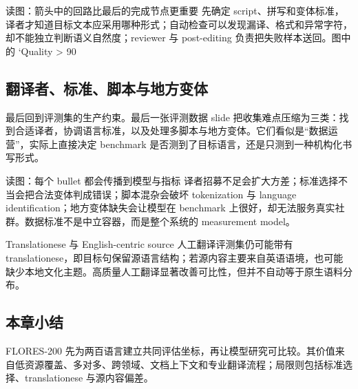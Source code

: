 \begin{knowledgebox}{读图：箭头中的回路比最后的完成节点更重要}
先确定 script、拼写和变体标准，译者才知道目标文本应采用哪种形式；自动检查可以发现漏译、格式和异常字符，却不能独立判断语义自然度；reviewer 与 post-editing 负责把失败样本送回。图中的 `Quality > 90%
\end{knowledgebox}


\subsection{翻译者、标准、脚本与地方变体}

最后回到评测集的生产约束。最后一张评测数据 slide 把收集难点压缩为三类：找到合适译者，协调语言标准，以及处理多脚本与地方变体。它们看似是“数据运营”，实际上直接决定 benchmark 是否测到了目标语言，还是只测到一种机构化书写形式。


\begin{knowledgebox}{读图：每个 bullet 都会传播到模型与指标}
译者招募不足会扩大方差；标准选择不当会把合法变体判成错误；脚本混杂会破坏 tokenization 与 language identification；地方变体缺失会让模型在 benchmark 上很好，却无法服务真实社群。数据标准不是中立容器，而是整个系统的 measurement model。
\end{knowledgebox}

\begin{warningbox}{Translationese 与 English-centric source}
人工翻译评测集仍可能带有 translationese，即目标句保留源语言结构；若源内容主要来自英语语境，也可能缺少本地文化主题。高质量人工翻译显著改善可比性，但并不自动等于原生语料分布。
\end{warningbox}

\subsection{本章小结}

FLORES-200 先为两百语言建立共同评估坐标，再让模型研究可比较。其价值来自低资源覆盖、多对多、跨领域、文档上下文和专业翻译流程；局限则包括标准选择、translationese 与源内容偏差。

